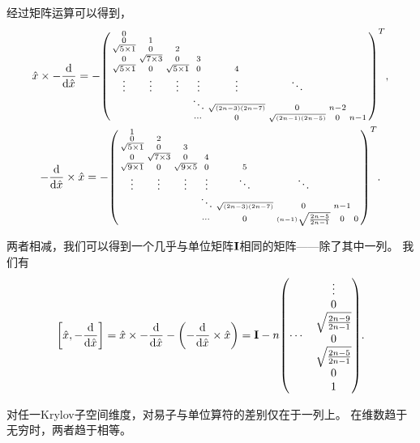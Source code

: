 \documentclass[a4paper,unicode]{report}
\newcommand{\chapterendname}{章}
\begin{document}
经过矩阵运算可以得到，
\begin{gather}
    \hat{x}\times -\dv{\hat{x}} =
    -\spmqty{
        0 &  &  &  &  &  &  &  \\
        0 & 1 &  &  &  &  &  &  \\
        \sqrt{5\times 1} & 0 & 2 &  &  &  &  &   \\
        0 & \sqrt{7\times 3} & 0 & 3 &  &  &  &   \\
        \sqrt{5\times 1} & 0 & \sqrt{5\times 1} & 0 & 4 &  &  &  \\
        \vdots & \vdots & \vdots & \vdots & \vdots & \ddots & & \\
        &  & & \ddots & {\scriptscriptstyle\sqrt{(2n-3)(2n-7)}} & 0 &  n-2 &  \\
        &  & & \cdots & 0 & {\scriptscriptstyle\sqrt{(2n-1)(2n-5)}} & 0 &  n-1
    }^T,\\
    -\dv{\hat{x}}\times \hat{x} =
    - \spmqty{
        1 &  &  &  &  &  &  &  \\
        0 & 2 &  &  &  &  &  &  \\
        \sqrt{5\times 1} & 0 & 3 &  &  &  &  &  \\
        0 & \sqrt{7\times 3} & 0 & 4 &  &  &  &  \\
        \sqrt{9\times 1} & 0 & \sqrt{9\times 5} & 0 & 5 &  &  &  \\
        \vdots & \vdots & \vdots & \vdots & \ddots & \ddots &  &  \\
        &  &  & \ddots & {\scriptscriptstyle\sqrt{(2n-3)(2n-7)}} & 0 &  n-1 &  \\
        &  &  & \cdots & 0 & {\scriptscriptstyle(n-1)\sqrt{\frac{2n-5}{2n-1}}} & 0 & 0
    }^T.
\end{gather}

两者相减，我们可以得到一个几乎与单位矩阵$\vb{I}$相同的矩阵——除了其中一列。
我们有
\begin{equation}
    \qty[\hat{x}, -\dv{\hat{x}}]
    = \hat{x}\times -\dv{\hat{x}} - \qty(-\dv{\hat{x}}\times \hat{x})
    = \vb{I} - n \mqty(
        \cdots &
        \mqty{
            \vdots\\
            0\\
            \sqrt{\frac{2n-9}{2n-1}}\\
            0\\
            \sqrt{\frac{2n-5}{2n-1}}\\
            0\\
            1
        }
    ).
\end{equation}

对任一Krylov子空间维度，对易子与单位算符的差别仅在于一列上。
在维数趋于无穷时，两者趋于相等。



% 
\end{document}
